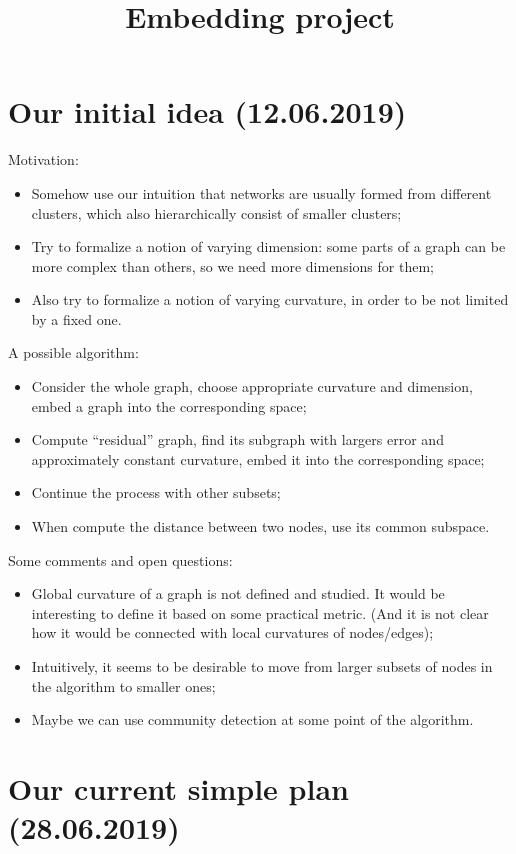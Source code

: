 \documentclass{article}
\title{Embedding project}
\author{}
\date{}
\begin{document}
\maketitle

\section{Our initial idea (12.06.2019)}

Motivation:
\begin{itemize}
    \item Somehow use our intuition that networks are usually formed from different clusters, which also hierarchically consist of smaller clusters;
    \item Try to formalize a notion of varying dimension: some parts of a graph can be more complex than others, so we need more dimensions for them;
    \item Also try to formalize a notion of varying curvature, in order to be not limited by a fixed one.
\end{itemize}
A possible algorithm:
\begin{itemize}
    \item Consider the whole graph, choose appropriate curvature and dimension, embed a graph into the corresponding space;
    \item Compute ``residual'' graph, find its subgraph with largers error and approximately constant curvature, embed it into the corresponding space;
    \item Continue the process with other subsets;
    \item When compute the distance between two nodes, use its common subspace.
\end{itemize}
Some comments and open questions:
\begin{itemize}
    \item Global curvature of a graph is not defined and studied. It would be interesting to define it based on some practical metric. (And it is not clear how it would be connected with local curvatures of nodes/edges);
    \item Intuitively, it seems to be desirable to move from larger subsets of nodes in the algorithm to smaller ones;
    \item Maybe we can use community detection at some point of the algorithm.
\end{itemize}

\section{Our current simple plan (28.06.2019)}
\end{document}
